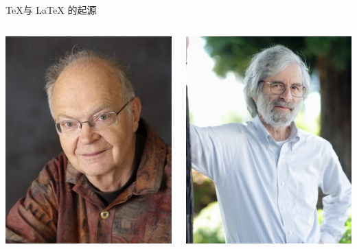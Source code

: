 \begin{frame}[fragile]{\TeX 与 \LaTeX{} 的起源}
\begin{columns}[T]
    \includegraphics[width=\textwidth]{Knuth.jpg}

    \includegraphics[width=\textwidth]{Lamport.jpg}


\end{columns}
\end{frame}
